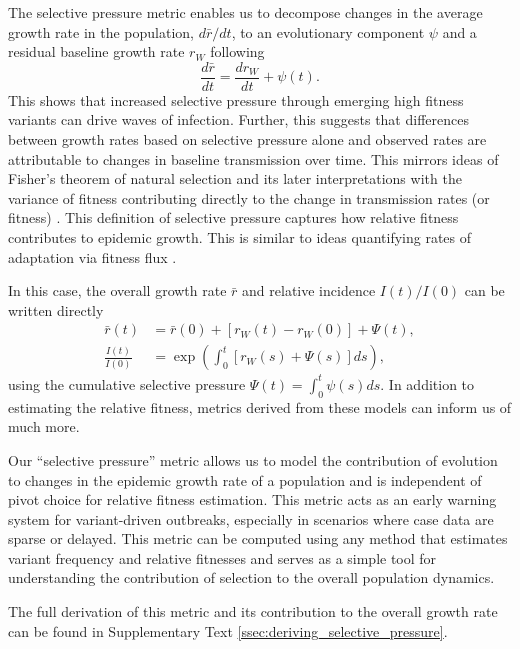 \documentclass[11pt,oneside,letterpaper]{article}
\newcommand{\wt}{W}
\begin{document}
The selective pressure metric enables us to decompose changes in the average growth rate in the population, $d\bar{r}/dt$, to an evolutionary component $\psi$ and a residual baseline growth rate $r_\wt$ following
\begin{equation}
    \frac{d\bar{r}}{dt} = \frac{dr_{\wt}}{dt} + \psi(t).
\end{equation}
This shows that increased selective pressure through emerging high fitness variants can drive waves of infection.
Further, this suggests that differences between growth rates based on selective pressure alone and observed rates are attributable to changes in baseline transmission over time.
This mirrors ideas of Fisher's theorem of natural selection and its later interpretations with the variance of fitness contributing directly to the change in transmission rates (or fitness) \cite{Ewens1989, Ewens2024}.
This definition of selective pressure captures how relative fitness contributes to epidemic growth.
This is similar to ideas quantifying rates of adaptation via fitness flux \cite{Mustonen2010}.

In this case, the overall growth rate $\bar{r}$ and relative incidence $I(t) / I(0)$ can be written directly
\begin{align}
    \bar{r}(t) &= \bar{r}(0) + [r_{\wt}(t) - r_{\wt}(0)] + \Psi(t),\\
    \frac{I(t)}{I(0)} &= \exp \left( \int_0^t [r_{\wt}(s) + \Psi(s)]ds \right),
\end{align}
using the cumulative selective pressure $\Psi(t) = \int_0^t \psi(s)ds$.
In addition to estimating the relative fitness, metrics derived from these models can inform us of much more.

Our ``selective pressure'' metric allows us to model the contribution of evolution to changes in the epidemic growth rate of a population and is independent of pivot choice for relative fitness estimation.
This metric acts as an early warning system for variant-driven outbreaks, especially in scenarios where case data are sparse or delayed.
This metric can be computed using any method that estimates variant frequency and relative fitnesses and serves as a simple tool for understanding the contribution of selection to the overall population dynamics.

The full derivation of this metric and its contribution to the overall growth rate can be found in Supplementary Text \ref{ssec:deriving_selective_pressure}.
\end{document}
